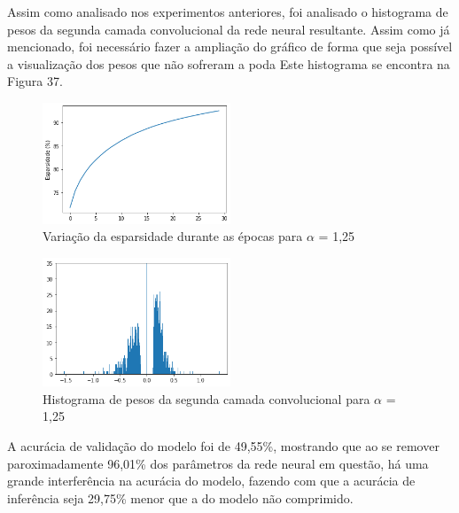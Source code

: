 Assim como analisado nos experimentos anteriores, foi analisado o histograma de pesos da segunda camada convolucional da rede neural resultante. Assim como já mencionado, foi necessário fazer a ampliação do gráfico de forma que seja possível a visualização dos pesos que não sofreram a poda Este histograma se encontra na Figura 37.

\begin{figure}[H]
	\includegraphics[width=0.5\textwidth, keepaspectratio=true]{figuras/CAP4/esparsidade125.png}
	\centering
	\caption[Variação da esparsidade durante as épocas para $\alpha$ = 1,25]{Variação da esparsidade durante as épocas para $\alpha$ = 1,25}
\end{figure}

\begin{figure}[H]
	\includegraphics[width=0.5\textwidth, keepaspectratio=true]{figuras/CAP4/hist_125_.png}
	\centering
	\caption[Histograma de pesos da segunda camada convolucional para $\alpha$ = 1,25]{Histograma de pesos da segunda camada convolucional para $\alpha$ = 1,25}
\end{figure}

A acurácia de validação do modelo foi de 49,55\%, mostrando que ao se remover paroximadamente 96,01\% dos parâmetros da rede neural em questão, há uma grande interferência na acurácia do modelo, fazendo com que a acurácia de inferência seja 29,75\% menor que a do modelo não comprimido.

